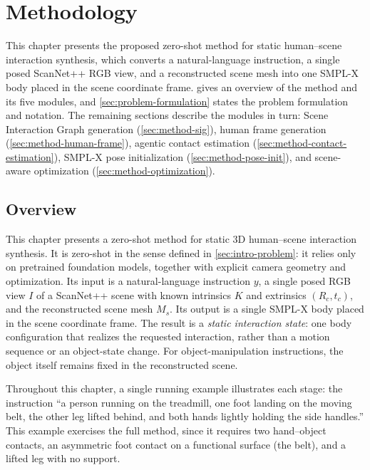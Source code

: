 \chapter{Methodology}
\label{chap:methodology}

This chapter presents the proposed zero-shot method for static human--scene interaction synthesis, which converts a natural-language instruction, a single posed ScanNet++ RGB view, and a reconstructed scene mesh into one SMPL-X body placed in the scene coordinate frame.  gives an overview of the method and its five modules, and \cref{sec:problem-formulation} states the problem formulation and notation. The remaining sections describe the modules in turn: Scene Interaction Graph generation (\cref{sec:method-sig}), human frame generation (\cref{sec:method-human-frame}), agentic contact estimation (\cref{sec:method-contact-estimation}), SMPL-X pose initialization (\cref{sec:method-pose-init}), and scene-aware optimization (\cref{sec:method-optimization}).

\section{Overview}
\label{sec:method-overview}

This chapter presents a zero-shot method for static 3D human--scene interaction synthesis. It is zero-shot in the sense defined in \cref{sec:intro-problem}: it relies only on pretrained foundation models, together with explicit camera geometry and optimization. Its input is a natural-language instruction $y$, a single posed RGB view $I$ of a ScanNet++ scene with known intrinsics $K$ and extrinsics $(R_c, t_c)$, and the reconstructed scene mesh $M_s$. Its output is a single SMPL-X body placed in the scene coordinate frame. The result is a \emph{static interaction state}: one body configuration that realizes the requested interaction, rather than a motion sequence or an object-state change. For object-manipulation instructions, the object itself remains fixed in the reconstructed scene.

Throughout this chapter, a single running example illustrates each stage: the instruction ``a person running on the treadmill, one foot landing on the moving belt, the other leg lifted behind, and both hands lightly holding the side handles.'' This example exercises the full method, since it requires two hand--object contacts, an asymmetric foot contact on a functional surface (the belt), and a lifted leg with no support.

